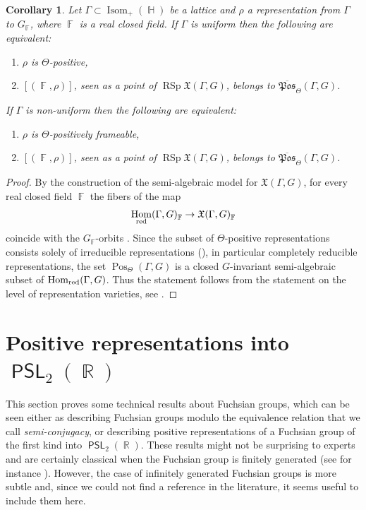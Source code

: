 \documentclass{amsart}
\theoremstyle{plain}
\newtheorem{corollary}[proposition]{Corollary}
\theoremstyle{definition}
\DeclareMathOperator{\PSL}{\mathsf{PSL}}
\DeclareMathOperator{\Hom}{Hom}
\DeclareMathOperator{\Isom}{Isom}
\DeclareMathOperator{\RSp}{RSp}
\DeclareMathOperator{\Pos}{Pos}
\DeclareMathOperator{\Fb}{{\mathbb{F}}}
\DeclareMathOperator{\Hb}{\mathbb{H}}
\DeclareMathOperator{\Rb}{{\mathbb{R}}}
\newcommand{\red}{\textnormal{red}}
\newcommand{\1}{\mathbf{1}}
\begin{document}
\begin{corollary}
    Let $\Gamma \subset \Isom_+(\Hb)$ be a lattice and $\rho$ a representation from $\Gamma$ to $G_{\Fb}$, where $\Fb$ is a real closed field.
    If $\Gamma$ is uniform then the following are equivalent:
    \begin{enumerate}
        \item $\rho$ is $\Theta$-positive,
        \item $[(\Fb,\rho)]$, seen as a point of $\RSp\mathfrak{X}(\Gamma,G)$, belongs to $\overline{\mathfrak{Pos}}_\Theta(\Gamma,G)$.
    \end{enumerate}
    If $\Gamma$ is non-uniform then the following are equivalent:
    \begin{enumerate}
        \item $\rho$ is $\Theta$-positively frameable,
        \item $[(\Fb,\rho)]$, seen as a point of $\RSp\mathfrak{X}(\Gamma,G)$, belongs to $\overline{\mathfrak{Pos}}_\Theta(\Gamma,G)$.
    \end{enumerate}
\end{corollary}
\begin{proof}
    By the construction of the semi-algebraic model for $\mathfrak{X}(\Gamma,G)$, for every real closed field $\Fb$ the fibers of the map
    \[\Hom_\red(\Gamma,G)_{\Fb} \to \mathfrak{X}(\Gamma,G)_{\Fb}\]
    coincide with the $G_{\Fb}$-orbits \cite[Proposition 7.4~(2)]{BurgerIozziParreauPozzetti_RSCCharacterVarieties2}.
    Since the subset of $\Theta$-positive representations consists solely of irreducible representations (), in particular completely reducible representations, the set $\Pos_\Theta(\Gamma,G)$ is a closed $G$-invariant semi-algebraic subset of $\Hom_{\red}(\Gamma,G)$.
    Thus the statement follows from the statement on the level of representation varieties, see .
\end{proof}

\appendix
\section{%
\texorpdfstring{%
Positive representations into $\PSL_2(\Rb)$}%
{Positive representations into PSL(2,R)}}
\label{appendix}

This section proves some technical results about Fuchsian groups, which can be seen either as describing Fuchsian groups modulo the equivalence relation that we call \emph{semi-conjugacy}, or describing positive representations of a Fuchsian group of the first kind into $\PSL_2(\Rb)$. These results might not be surprising to experts and are certainly classical when the Fuchsian group is finitely generated (see for instance \cite{Katok}). However, the case of infinitely generated Fuchsian groups is more subtle and, since we could not find a reference in the literature, it seems useful to include them here.
\end{document}
